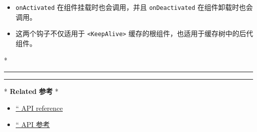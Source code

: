 \begin{paracol}{2}
\switchcolumn
\begin{itemize}
\item
  \texttt{onActivated} 在组件挂载时也会调用，并且 \texttt{onDeactivated}
  在组件卸载时也会调用。
\item
  这两个钩子不仅适用于 \texttt{\textless{}KeepAlive\textgreater{}}
  缓存的根组件，也适用于缓存树中的后代组件。
\end{itemize}
\switchcolumn[0]*%
\begin{center}\rule{0.5\linewidth}{0.5pt}\end{center}
\switchcolumn
\begin{center}\rule{0.5\linewidth}{0.5pt}\end{center}
\switchcolumn[0]*%
\textbf{Related}
\switchcolumn
\textbf{参考}
\switchcolumn[0]*%
\begin{itemize}
\item
  \href{https://vuejs.org/api/built-in-components.html\#keepalive}{``
  API reference}
\end{itemize}
\switchcolumn
\begin{itemize}
\item
  \href{https://cn.vuejs.org/api/built-in-components.html\#keepalive}{``
  API 参考}
\end{itemize}
\end{paracol}
